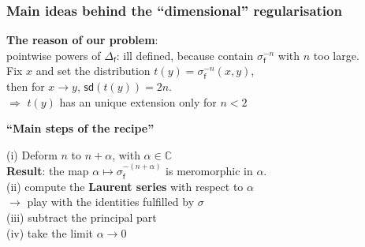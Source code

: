 \documentclass[9pt]{beamer}
\newcommand{\sd}{\mathsf{sd}} %
\newcommand{\Cbb}{\mathbb{C}}
\newcommand{\fsf}{\mathsf{f}}
\begin{document}

\begin{frame}[label=meromorphic]

\frametitle{Main ideas behind the ``dimensional'' regularisation}



 


\textbf{The reason of our problem}: \\
pointwise powers of $\Delta_\fsf$: ill defined, because contain $\sigma_\fsf^{-n}$ with $n$ too large. \\
Fix $x$ and set the distribution $t(y) = \sigma_\fsf^{-n}(x,y)$, \\
then for $x \to y$, $\sd(t(y)) = 2n$. \\
$\Rightarrow$ $t(y)$ has an unique extension only for $n < 2$

\vspace*{16pt}


\textbf{``Main steps of the recipe''}

(i) Deform $n$ to $n + \alpha$, with $\alpha \in \Cbb$ \\

\qquad \textbf{Result}: the map $\alpha \mapsto \sigma_\fsf^{-(n+\alpha)}$ is meromorphic in $\alpha$. \hfill \hyperlink{proof_meromorphic}{} \\ 
 
(ii) compute the \textbf{Laurent series} with respect to $\alpha$ \\
\qquad $\to$ play with the identities fulfilled by $\sigma$ \\
 
(iii) subtract the principal part \\
 
(iv) take the limit $\alpha \to 0$ \\
 
\end{frame}

\end{document}
